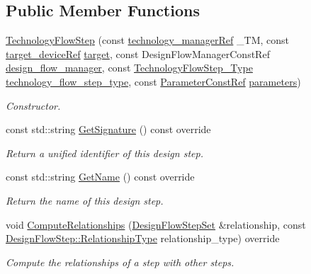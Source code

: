 \subsection*{Public Member Functions}
\begin{DoxyCompactItemize}
\item 
\hyperlink{classTechnologyFlowStep_a29b32c99d4f7f81c7eaa2128f4f15bdd}{Technology\+Flow\+Step} (const \hyperlink{technology__manager_8hpp_a4b9ecd440c804109c962654f9227244e}{technology\+\_\+manager\+Ref} \+\_\+\+TM, const \hyperlink{target__device_8hpp_acedb2b7a617e27e6354a8049fee44eda}{target\+\_\+device\+Ref} \hyperlink{classTechnologyFlowStep_a1a16880c55bddc3f9dbc495636d7a8cb}{target}, const Design\+Flow\+Manager\+Const\+Ref \hyperlink{classDesignFlowStep_ab770677ddf087613add30024e16a5554}{design\+\_\+flow\+\_\+manager}, const \hyperlink{technology__flow__step_8hpp_a65208cfec963a7d7def292f9db428292}{Technology\+Flow\+Step\+\_\+\+Type} \hyperlink{classTechnologyFlowStep_a599a03a1ab1c3a71f3ac3bfbaed868b4}{technology\+\_\+flow\+\_\+step\+\_\+type}, const \hyperlink{Parameter_8hpp_a37841774a6fcb479b597fdf8955eb4ea}{Parameter\+Const\+Ref} \hyperlink{classDesignFlowStep_a802eaafe8013df706370679d1a436949}{parameters})
\begin{DoxyCompactList}\small\item\em Constructor. \end{DoxyCompactList}\item 
const std\+::string \hyperlink{classTechnologyFlowStep_a56b1c17014e131852e07a52bceee38e0}{Get\+Signature} () const override
\begin{DoxyCompactList}\small\item\em Return a unified identifier of this design step. \end{DoxyCompactList}\item 
const std\+::string \hyperlink{classTechnologyFlowStep_ac50a4cc6222e4872c65c93f55415c3b7}{Get\+Name} () const override
\begin{DoxyCompactList}\small\item\em Return the name of this design step. \end{DoxyCompactList}\item 
void \hyperlink{classTechnologyFlowStep_a94c17619fd6b02de821d7e41ff454d85}{Compute\+Relationships} (\hyperlink{classDesignFlowStepSet}{Design\+Flow\+Step\+Set} \&relationship, const \hyperlink{classDesignFlowStep_a723a3baf19ff2ceb77bc13e099d0b1b7}{Design\+Flow\+Step\+::\+Relationship\+Type} relationship\+\_\+type) override
\begin{DoxyCompactList}\small\item\em Compute the relationships of a step with other steps. \end{DoxyCompactList}\item 

\end{DoxyCompactItemize}
